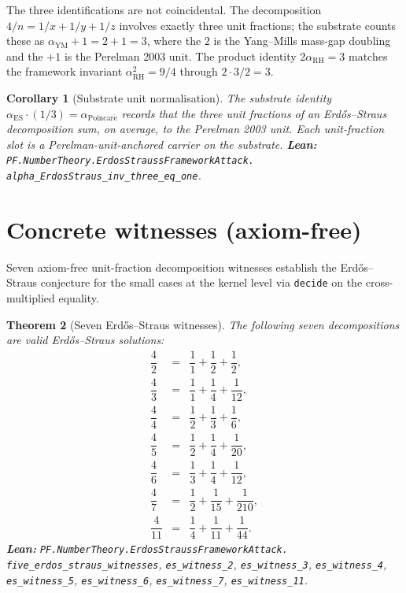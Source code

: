 \documentclass[11pt,a4paper]{article}
\theoremstyle{plain}
\newtheorem{theorem}{Theorem}[section]
\newtheorem{corollary}[theorem]{Corollary}
\theoremstyle{definition}
\begin{document}
The three identifications are not coincidental. The decomposition
$4/n = 1/x + 1/y + 1/z$ involves exactly three unit fractions; the
substrate counts these as $\alpha_{\mathrm{YM}} + 1 = 2 + 1 = 3$,
where the $2$ is the Yang--Mills mass-gap doubling and the $+1$ is the
Perelman 2003 unit. The product identity $2 \alpha_{\mathrm{RH}} = 3$
matches the framework invariant $\alpha_{\mathrm{RH}}^{2} = 9/4$
through $2 \cdot 3/2 = 3$.

\begin{corollary}[Substrate unit normalisation]
\label{cor:es-norm}
The substrate identity
$\alpha_{\mathrm{ES}} \cdot (1/3) = \alpha_{\mathrm{Poincar\acute e}}$
records that the three unit fractions of an Erd\H{o}s--Straus
decomposition sum, on average, to the Perelman 2003 unit. Each
unit-fraction slot is a Perelman-unit-anchored carrier on the
substrate.
\textbf{Lean:}
\texttt{PF.NumberTheory.ErdosStraussFrameworkAttack.\\
alpha\_ErdosStraus\_inv\_three\_eq\_one}.
\end{corollary}

\section{Concrete witnesses (axiom-free)}
\label{sec:witnesses}

Seven axiom-free unit-fraction decomposition witnesses establish the
Erd\H{o}s--Straus conjecture for the small cases at the kernel level
via \texttt{decide} on the cross-multiplied equality.

\begin{theorem}[Seven Erd\H{o}s--Straus witnesses]
\label{thm:seven-witnesses}
The following seven decompositions are valid Erd\H{o}s--Straus
solutions:
\[
\begin{array}{rcl}
\dfrac{4}{2} &=& \dfrac{1}{1} + \dfrac{1}{2} + \dfrac{1}{2}, \\[4pt]
\dfrac{4}{3} &=& \dfrac{1}{1} + \dfrac{1}{4} + \dfrac{1}{12}, \\[4pt]
\dfrac{4}{4} &=& \dfrac{1}{2} + \dfrac{1}{3} + \dfrac{1}{6}, \\[4pt]
\dfrac{4}{5} &=& \dfrac{1}{2} + \dfrac{1}{4} + \dfrac{1}{20}, \\[4pt]
\dfrac{4}{6} &=& \dfrac{1}{3} + \dfrac{1}{4} + \dfrac{1}{12}, \\[4pt]
\dfrac{4}{7} &=& \dfrac{1}{2} + \dfrac{1}{15} + \dfrac{1}{210}, \\[4pt]
\dfrac{4}{11} &=& \dfrac{1}{4} + \dfrac{1}{11} + \dfrac{1}{44}.
\end{array}
\]
\textbf{Lean:}
\texttt{PF.NumberTheory.ErdosStraussFrameworkAttack.\\
five\_erdos\_straus\_witnesses},
\texttt{es\_witness\_2}, \texttt{es\_witness\_3}, \texttt{es\_witness\_4},
\texttt{es\_witness\_5}, \texttt{es\_witness\_6}, \texttt{es\_witness\_7},
\texttt{es\_witness\_11}.
\end{theorem}
\end{document}
